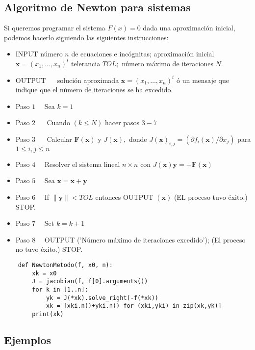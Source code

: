 \subsection{Algoritmo de Newton para sistemas}

Si queremos programar el sistema $F(x) = 0$ dada una aproximación inicial, podemos hacerlo siguiendo las siguientes instrucciones: \\

\begin{itemize}
\item INPUT número $n$ de ecuaciones e incógnitas; aproximación inicial $\mathbf{x}=\left(x_{1}, \ldots, x_{n}\right)^{t}$ telerancia $T O L ;$ número máximo de iteraciones $N$. 
\item OUTPUT $\quad$ solución aproximada $\mathbf{x}=\left(x_{1}, \ldots, x_{n}\right)^{t}$ ó un mensaje que indique que el número de iteraciones se ha excedido.
\item Paso $1 \quad$ Sea $k=1$
\item Paso 2 $\quad$ Cuando $(k \leq N)$ hacer pasos $3-7$
\item Paso 3 $\quad$ Calcular $\mathbf{F}(\mathbf{x})$ y $J(\mathbf{x}),$ donde $J(\mathbf{x})_{i, j}=\left(\partial f_{i}(\mathbf{x}) / \partial x_{j}\right)$ para $1 \leq i, j \leq n$
\item Paso $4 \quad$ Resolver el sistema lineal $n \times n$ con $J(\mathbf{x}) \mathbf{y}=-\mathbf{F}(\mathbf{x})$
\item Paso $5 \quad$ Sea $\mathbf{x}=\mathbf{x}+\mathbf{y}$
\item Paso $6 \quad$ If $\|\mathbf{y}\|<T O L$ entonces OUTPUT $(\mathbf{x})$ (EL proceso tuvo éxito.) STOP.
\item Paso $7 \quad$ Set $k=k+1$
\item Paso $8 \quad$ OUTPUT ('Número máximo de iteraciones excedido'); (El proceso no tuvo éxito.) STOP.
\end{itemize}


\begin{verbatim}
	def NewtonMetodo(f, x0, n):
		xk = x0
		J = jacobian(f, f[0].arguments())
		for k in [1..n]:
			yk = J(*xk).solve_right(-f(*xk))
			xk = [xki.n()+yki.n() for (xki,yki) in zip(xk,yk)]
		print(xk)
\end{verbatim}

\subsection{Ejemplos}

